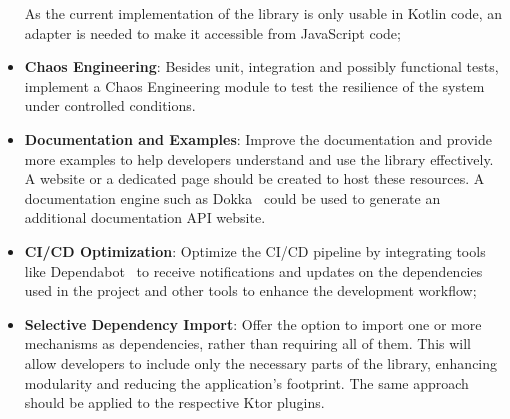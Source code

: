 \begin{itemize}
    As the current implementation of the library is only usable in Kotlin code, an adapter is needed to make it accessible from JavaScript code;
    \item \textbf{Chaos Engineering}: Besides unit, integration and possibly functional tests, implement a Chaos Engineering module to test the resilience of the system under controlled conditions.
    \item \textbf{Documentation and Examples}:
    Improve the documentation
    and provide more examples to help developers understand and use the library effectively.
    A website or a dedicated page should be created
    to host these resources.
    A documentation engine such as Dokka~\cite{dokka} could be used to generate an additional documentation API website.
    \item \textbf{CI/CD Optimization}:
    Optimize the CI/CD pipeline by integrating tools like Dependabot~\cite{github-dependabot} to receive notifications and updates on the dependencies used in the project and other tools to enhance the development workflow;
    \item \textbf{Selective Dependency Import}:
    Offer the option to import one or more mechanisms as dependencies, rather than requiring all of them.
    This will allow developers to include only the necessary parts of the library, enhancing modularity and reducing the application's footprint.
    The same approach should be applied to the respective Ktor plugins.
\end{itemize}
